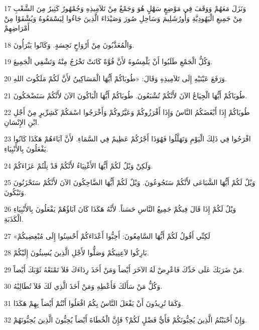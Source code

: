 \par 17 وَنَزَلَ مَعَهُمْ وَوَقَفَ فِي مَوْضِعٍ سَهْلٍ هُوَ وَجَمْعٌ مِنْ تَلاَمِيذِهِ وَجُمْهُورٌ كَثِيرٌ مِنَ الشَّعْبِ مِنْ جَمِيعِ الْيَهُودِيَّةِ وَأُورُشَلِيمَ وَسَاحِلِ صُورَ وَصَيْدَاءَ الَّذِينَ جَاءُوا لِيَسْمَعُوهُ وَيُشْفَوْا مِنْ أَمْرَاضِهِمْ
\par 18 وَالْمُعَذَّبُونَ مِنْ أَرْوَاحٍ نَجِسَةٍ. وَكَانُوا يَبْرَأُونَ.
\par 19 وَكُلُّ الْجَمْعِ طَلَبُوا أَنْ يَلْمِسُوهُ لأَنَّ قُوَّةً كَانَتْ تَخْرُجُ مِنْهُ وَتَشْفِي الْجَمِيعَ.
\par 20 وَرَفَعَ عَيْنَيْهِ إِلَى تَلاَمِيذِهِ وَقَالَ: «طُوبَاكُمْ أَيُّهَا الْمَسَاكِينُ لأَنَّ لَكُمْ مَلَكُوتَ اللهِ.
\par 21 طُوبَاكُمْ أَيُّهَا الْجِيَاعُ الآنَ لأَنَّكُمْ تُشْبَعُونَ. طُوبَاكُمْ أَيُّهَا الْبَاكُونَ الآنَ لأَنَّكُمْ سَتَضْحَكُونَ.
\par 22 طُوبَاكُمْ إِذَا أَبْغَضَكُمُ النَّاسُ وَإِذَا أَفْرَزُوكُمْ وَعَيَّرُوكُمْ وَأَخْرَجُوا اسْمَكُمْ كَشِرِّيرٍ مِنْ أَجْلِ ابْنِ الإِنْسَانِ.
\par 23 افْرَحُوا فِي ذَلِكَ الْيَوْمِ وَتَهَلَّلُوا فَهُوَذَا أَجْرُكُمْ عَظِيمٌ فِي السَّمَاءِ. لأَنَّ آبَاءَهُمْ هَكَذَا كَانُوا يَفْعَلُونَ بِالأَنْبِيَاءِ.
\par 24 وَلَكِنْ وَيْلٌ لَكُمْ أَيُّهَا الأَغْنِيَاءُ لأَنَّكُمْ قَدْ نِلْتُمْ عَزَاءَكُمْ.
\par 25 وَيْلٌ لَكُمْ أَيُّهَا الشَّبَاعَى لأَنَّكُمْ سَتَجُوعُونَ. وَيْلٌ لَكُمْ أَيُّهَا الضَّاحِكُونَ الآنَ لأَنَّكُمْ سَتَحْزَنُونَ وَتَبْكُونَ.
\par 26 وَيْلٌ لَكُمْ إِذَا قَالَ فِيكُمْ جَمِيعُ النَّاسِ حَسَناً. لأَنَّهُ هَكَذَا كَانَ آبَاؤُهُمْ يَفْعَلُونَ بِالأَنْبِيَاءِ الْكَذَبَةِ.
\par 27 «لَكِنِّي أَقُولُ لَكُمْ أَيُّهَا السَّامِعُونَ: أَحِبُّوا أَعْدَاءَكُمْ أَحْسِنُوا إِلَى مُبْغِضِيكُمْ
\par 28 بَارِكُوا لاَعِنِيكُمْ وَصَلُّوا لأَجْلِ الَّذِينَ يُسِيئُونَ إِلَيْكُمْ.
\par 29 مَنْ ضَرَبَكَ عَلَى خَدِّكَ فَاعْرِضْ لَهُ الآخَرَ أَيْضاً وَمَنْ أَخَذَ رِدَاءَكَ فَلاَ تَمْنَعْهُ ثَوْبَكَ أَيْضاً.
\par 30 وَكُلُّ مَنْ سَأَلَكَ فَأَعْطِهِ وَمَنْ أَخَذَ الَّذِي لَكَ فَلاَ تُطَالِبْهُ.
\par 31 وَكَمَا تُرِيدُونَ أَنْ يَفْعَلَ النَّاسُ بِكُمُ افْعَلُوا أَنْتُمْ أَيْضاً بِهِمْ هَكَذَا.
\par 32 وَإِنْ أَحْبَبْتُمُ الَّذِينَ يُحِبُّونَكُمْ فَأَيُّ فَضْلٍ لَكُمْ؟ فَإِنَّ الْخُطَاةَ أَيْضاً يُحِبُّونَ الَّذِينَ يُحِبُّونَهُمْ.
